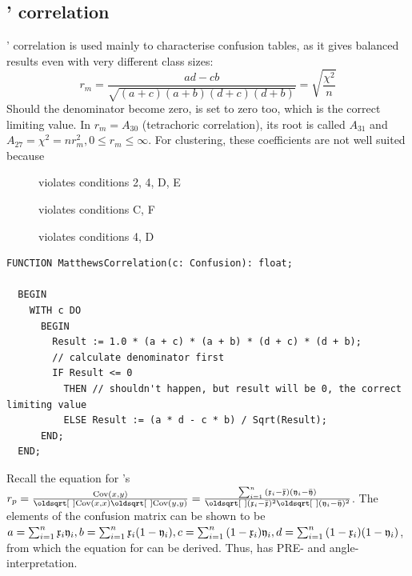 \begin{refsection}
\subsection{' correlation }\label{text:Matt}

' correlation \parencite{Mat-75} is used mainly to characterise confusion tables, as it gives balanced results even with very different class sizes:
\begin{equation}
   r_m = \frac{ad - cb}{\sqrt{(a+c) (a+b) (d+c) (d+b)}} = \sqrt{\frac{\chi^2}{n}}
\end{equation}
Should the denominator become zero,  is set to zero too, which is the correct limiting value.  In \parencite{Hub-82} \( r_m = A_{30} \) (tetrachoric correlation), its root is called \(A_{31} \) and \( A_{27} = \chi^2 = n r_m^2, 0 \leq r_m \leq \infty \). For clustering, these coefficients are not well suited because
\begin{description}
  \item[]{violates conditions 2, 4, D, E}
  \item[]{violates conditions C, F }
  \item[]{violates conditions 4, D }
\end{description}

\begin{lstlisting}[caption=\Name{Matthews}' correlation ]
  FUNCTION MatthewsCorrelation(c: Confusion): float;

  BEGIN
    WITH c DO
      BEGIN
        Result := 1.0 * (a + c) * (a + b) * (d + c) * (d + b);
        // calculate denominator first
        IF Result <= 0
          THEN // shouldn't happen, but result will be 0, the correct limiting value
          ELSE Result := (a * d - c * b) / Sqrt(Result);
      END;
  END;
\end{lstlisting}

Recall the equation for 's \( r_p = \frac{\cov(x,y)}{\sqrt{\cov(x,x)} \sqrt{\cov(y,y)}} = \frac{\sum_{i=1}^n{(\AbsVec{x}_i - \bar{\AbsVec{x}})(\AbsVec{y}_i - \bar{\AbsVec{y}})}}{\sqrt{(\AbsVec{x}_i - \bar{\AbsVec{x}})^2} \sqrt{(\AbsVec{y}_i - \bar{\AbsVec{y}})^2}}\). The elements of the confusion matrix can be shown to be \( a = \sum_{i=1}^n{\mathfrak{x}_{i}\mathfrak{y}_{i}}, b = \sum_{i=1}^n{\mathfrak{x}_{i}(1-\mathfrak{y}_{i})}, c = \sum_{i=1}^n{(1-\mathfrak{x}_{i})\mathfrak{y}_{i}}, d = \sum_{i=1}^n{(1-\mathfrak{x}_{i})(1-\mathfrak{y}_{i})} \), from which the equation for  can be derived. Thus,  has \acs{PRE}- and angle-interpretation.


\end{refsection}
